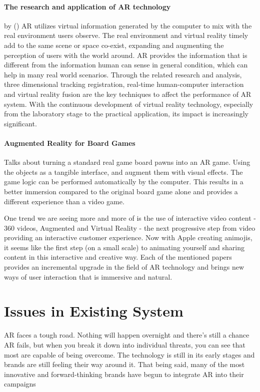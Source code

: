 \documentclass[BTech]{srmuthesis}
\begin{document}
\paragraph{The research and application of AR technology} by (\cite{researchar})
AR utilizes virtual information generated by the computer
to mix with the real environment users observe. The real
environment and virtual reality timely add to the same scene
or space co-exist, expanding and augmenting the perception of
users with the world around. AR provides the information that
is different from the information human can sense in general
condition, which can help in many real world scenarios.
Through the related research and analysis, three dimensional
tracking registration, real-time human-computer
interaction and virtual reality fusion are the key techniques to
affect the performance of AR system. With the continuous
development of virtual reality technology, especially from
the laboratory stage to the practical application, its impact is
increasingly significant.


\paragraph{Augmented Reality for Board Games} Talks about turning a standard real game board pawns into an AR game. Using the objects as a tangible interface, and augment them with visual effects. The game logic can be performed automatically by the computer. This results in a better immersion compared to the original board game alone and provides a different experience than a video game.

One trend we are seeing more and more of is the use of interactive video content - 360 videos, Augmented and Virtual Reality - the next progressive step from video providing an interactive customer experience. Now with Apple creating animojis, it seems like the first step (on a small scale) to animating yourself and sharing content in this interactive and creative way. Each of the mentioned papers provides an incremental upgrade in the field of AR technology and brings new ways of user interaction that is immersive and natural.

\section{Issues in Existing System}
AR faces a tough road. Nothing will happen overnight and there’s still a chance AR fails, but when you break it down into individual threats, you can see that most are capable of being overcome. The technology is still in its early stages and brands are still feeling their way around it. That  being said, many of the most innovative and forward-thinking brands have begun to integrate AR into their campaigns
\end{document}
